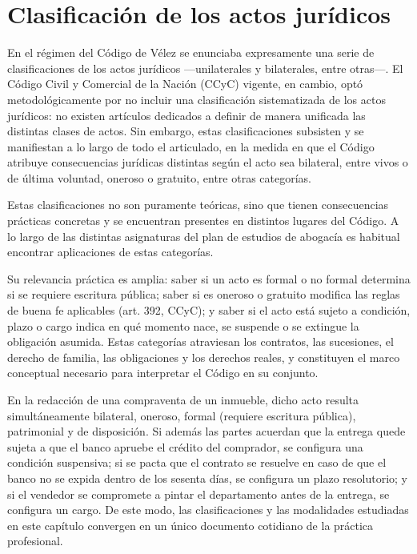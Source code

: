 \documentclass[12pt,oneside]{book}
\begin{document}


\chapter{Clasificación de los actos jurídicos}

En el régimen del Código de Vélez se enunciaba expresamente una serie de clasificaciones de los actos jurídicos ---unilaterales y bilaterales, entre otras---. El Código Civil y Comercial de la Nación (CCyC) vigente, en cambio, optó metodológicamente por no incluir una clasificación sistematizada de los actos jurídicos: no existen artículos dedicados a definir de manera unificada las distintas clases de actos. Sin embargo, estas clasificaciones subsisten y se manifiestan a lo largo de todo el articulado, en la medida en que el Código atribuye consecuencias jurídicas distintas según el acto sea bilateral, entre vivos o de última voluntad, oneroso o gratuito, entre otras categorías.

\begin{nota}
Estas clasificaciones no son puramente teóricas, sino que tienen consecuencias prácticas concretas y se encuentran presentes en distintos lugares del Código. A lo largo de las distintas asignaturas del plan de estudios de abogacía es habitual encontrar aplicaciones de estas categorías.
\end{nota}

Su relevancia práctica es amplia: saber si un acto es formal o no formal determina si se requiere escritura pública; saber si es oneroso o gratuito modifica las reglas de buena fe aplicables (art. 392, CCyC); y saber si el acto está sujeto a condición, plazo o cargo indica en qué momento nace, se suspende o se extingue la obligación asumida. Estas categorías atraviesan los contratos, las sucesiones, el derecho de familia, las obligaciones y los derechos reales, y constituyen el marco conceptual necesario para interpretar el Código en su conjunto.

\begin{ejemplo}
En la redacción de una compraventa de un inmueble, dicho acto resulta simultáneamente bilateral, oneroso, formal (requiere escritura pública), patrimonial y de disposición. Si además las partes acuerdan que la entrega quede sujeta a que el banco apruebe el crédito del comprador, se configura una condición suspensiva; si se pacta que el contrato se resuelve en caso de que el banco no se expida dentro de los sesenta días, se configura un plazo resolutorio; y si el vendedor se compromete a pintar el departamento antes de la entrega, se configura un cargo. De este modo, las clasificaciones y las modalidades estudiadas en este capítulo convergen en un único documento cotidiano de la práctica profesional.
\end{ejemplo}
\end{document}
